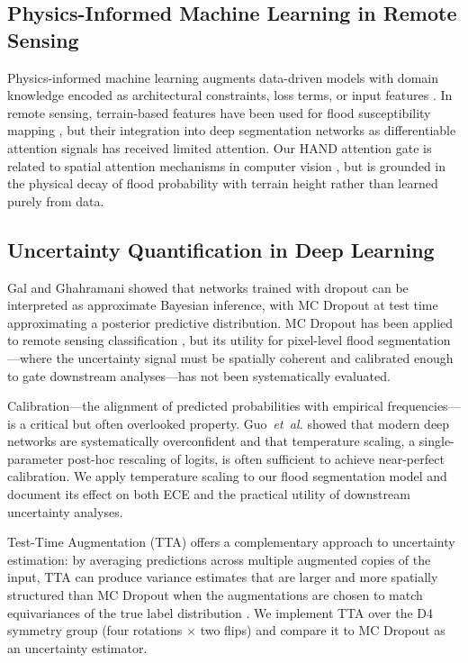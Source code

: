 \documentclass[12pt]{article}
\newcommand{\etal}{\textit{et~al.}}
\begin{document}
\subsection{Physics-Informed Machine Learning in Remote Sensing}

Physics-informed machine learning augments data-driven models with domain
knowledge encoded as architectural constraints, loss terms, or input features
\cite{karniadakis2021physics}.  In remote sensing, terrain-based features have
been used for flood susceptibility mapping \cite{tehrany2015flood}, but their
integration into deep segmentation networks as differentiable attention signals
has received limited attention.  Our HAND attention gate is related to
spatial attention mechanisms in computer vision \cite{woo2018cbam}, but is
grounded in the physical decay of flood probability with terrain height rather
than learned purely from data.

\subsection{Uncertainty Quantification in Deep Learning}

Gal and Ghahramani \cite{gal2016dropout} showed that networks trained with
dropout can be interpreted as approximate Bayesian inference, with MC Dropout
at test time approximating a posterior predictive distribution.  MC Dropout
has been applied to remote sensing classification \cite{kampffmeyer2016semantic},
but its utility for pixel-level flood segmentation—where the uncertainty
signal must be spatially coherent and calibrated enough to gate downstream
analyses—has not been systematically evaluated.

Calibration—the alignment of predicted probabilities with empirical
frequencies—is a critical but often overlooked property.  Guo~\etal
\cite{guo2017calibration} showed that modern deep networks are systematically
overconfident and that temperature scaling, a single-parameter post-hoc
rescaling of logits, is often sufficient to achieve near-perfect calibration.
We apply temperature scaling to our flood segmentation model and document its
effect on both ECE and the practical utility of downstream uncertainty analyses.

Test-Time Augmentation (TTA) offers a complementary approach to uncertainty
estimation: by averaging predictions across multiple augmented copies of the
input, TTA can produce variance estimates that are larger and more spatially
structured than MC Dropout when the augmentations are chosen to match
equivariances of the true label distribution \cite{ayhan2022test}.  We
implement TTA over the D4 symmetry group (four rotations $\times$ two flips)
and compare it to MC Dropout as an uncertainty estimator.
\end{document}
